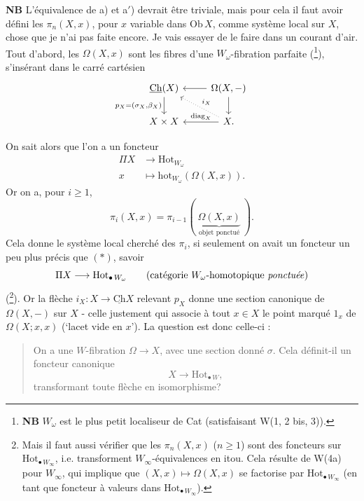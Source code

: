 \documentclass[11pt]{article}
\newcommand{\printedpage}[1]{{\reversemarginpar\marginnote{\raggedleft\scriptsize ed.~#1}}}
\newcommand{\msp}[1]{\marginpar{\raggedright\scriptsize ms.~#1}}
\newcommand{\Ch}{\underline{\mathrm{Ch}}}
\newcommand{\Hotp}[1]{\mathrm{Hot}_{\bullet\,#1}}
\newcommand{\Ob}{\mathrm{Ob}\,}
\begin{document}
\msp{page 173}

\textbf{NB} L'équivalence de a) et a$'$) devrait être triviale, mais pour cela il faut avoir défini les $\pi_n(X,x)$, pour $x$ variable dans $\Ob X$, comme système local sur $X$, chose que je n'ai pas faite encore. Je vais essayer de le faire dans un courant d'air. Tout d'abord, les $\Omega(X,x)$ sont les fibres d'une $W_\omega$-fibration parfaite (\footnote[113]{\textbf{NB} $W_\omega$ est le plus petit localiseur de Cat (satisfaisant W(1, 2 bis, 3)).}), s'insérant dans le carré cartésien
\[
\begin{tikzcd}
\Ch(X) \arrow[d, "{p_X=(\sigma_X,\beta_X)}"'] & \Omega(X,-) \arrow[l] \arrow[d] \\
X \times X & X. \arrow[l, "\mathrm{diag}_X"'] \arrow[ul, dotted, "i_X"']
\end{tikzcd}
\]

\clearpage

\printedpage{117}

On sait alors que l'on a un foncteur
\[
\begin{aligned}
\Pi X &\longrightarrow \mathrm{Hot}_{W_\omega}\\
x &\longmapsto \mathrm{hot}_{W_\omega}(\Omega(X,x)).
\end{aligned}
\tag*{$(*)$}
\]
Or on a, pour $i \geq 1$,
\[
\pi_i(X,x) = \pi_{i-1}(\ \underbrace{\Omega(X,x)}_{\text{objet ponctué}}\ ).
\]
Cela donne le système local cherché des $\pi_i$, si seulement on avait un foncteur un peu plus précis que $(*)$, savoir
\[
\Pi X \longrightarrow \Hotp{W_\omega} \qquad \text{(catégorie $W_\omega$-homotopique \textit{ponctuée})}
\]
(\footnote[114]{Mais il faut aussi vérifier que les $\pi_n(X,x)$ ($n \geq 1$) sont des foncteurs sur $\Hotp{W_\infty}$, i.e. transforment $W_\infty$-équivalences en itou. Cela résulte de W(4a) pour $W_\infty$, qui implique que $(X,x) \mapsto \Omega(X,x)$ se factorise par $\Hotp{W_\infty}$ (en tant que foncteur à valeurs dans $\Hotp{W_\infty}$).}). Or la flèche $i_X : X \longrightarrow \Ch X$ relevant $p_X$ donne une section canonique de $\Omega(X,-)$ sur $X$ -
\msp{page 174}
celle justement qui associe à tout $x \in X$ le point marqué $1_x$ de $\Omega(X;x,x)$ (`lacet vide en $x$'). La question est donc celle-ci :

\begin{quote}
On a une $W$-fibration $\Omega \longrightarrow X$, avec une section donné $\sigma$. Cela définit-il un foncteur canonique %
\[
X \longrightarrow \Hotp{W},
\]
transformant toute flèche en isomorphisme?
\end{quote}
\end{document}
